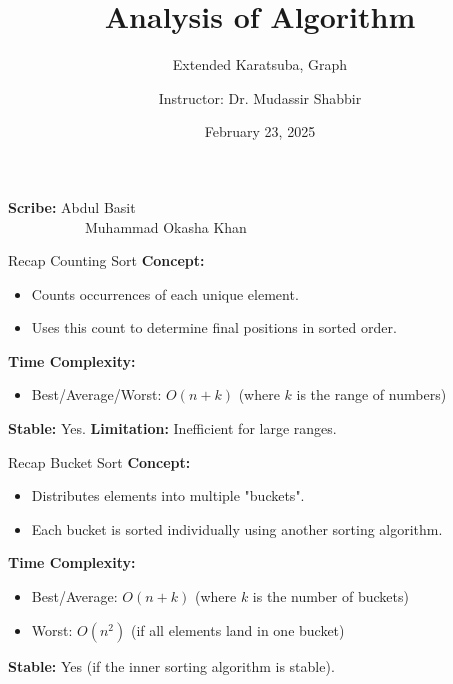 \documentclass{beamer}
\title{Analysis of Algorithm}
\subtitle{Extended Karatsuba, Graph}
\author{Instructor: Dr. Mudassir Shabbir}
\institute{ITU}
\date{February 23, 2025}
\begin{document}
\begin{frame}
    \titlepage
    \vspace{1cm}
    \textbf{Scribe:}
 Abdul Basit \\ \ \ \ \ \ \ \ \ \ \ \ Muhammad Okasha Khan
\end{frame}




\begin{frame}{Recap Counting Sort}
    \textbf{Concept:} 
    \begin{itemize}
        \item Counts occurrences of each unique element.
        \item Uses this count to determine final positions in sorted order.
    \end{itemize}
    \textbf{Time Complexity:}
    \begin{itemize}
        \item Best/Average/Worst: $O(n + k)$ (where $k$ is the range of numbers)
    \end{itemize}
    \textbf{Stable:} Yes. \newline
    \textbf{Limitation:} Inefficient for large ranges.
\end{frame}

\begin{frame}{Recap Bucket Sort}
    \textbf{Concept:} 
    \begin{itemize}
        \item Distributes elements into multiple "buckets".
        \item Each bucket is sorted individually using another sorting algorithm.
    \end{itemize}
    \textbf{Time Complexity:}
    \begin{itemize}
        \item Best/Average: $O(n + k)$ (where $k$ is the number of buckets)
        \item Worst: $O(n^2)$ (if all elements land in one bucket)
    \end{itemize}
    \textbf{Stable:} Yes (if the inner sorting algorithm is stable).
\end{frame}
\end{document}
